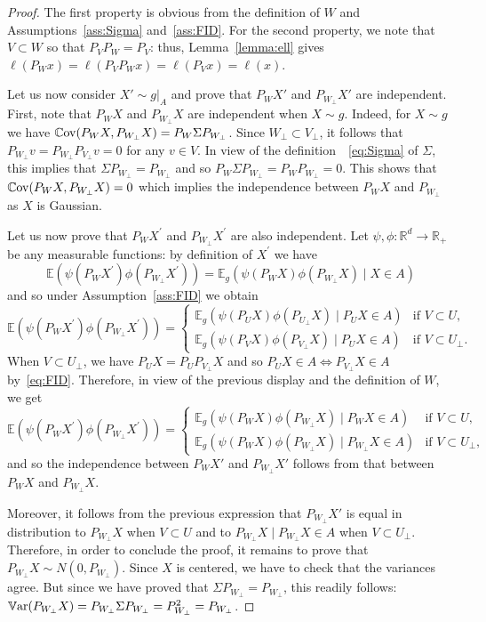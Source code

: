 \documentclass[]{article}
\newcommand{\E}{\mathbb{E}}
\newcommand{\R}{\mathbb{R}}
\newcommand{\Var}{\mathbb{V}\text{\textnormal{ar}}}
\newcommand{\Cov}{\mathbb{C}\text{\textnormal{ov}}}
\theoremstyle{plain}
\theoremstyle{definition}
\begin{document}
\begin{proof}
	The first property is obvious from the definition of $W$ and Assumptions~\ref{ass:Sigma} and~\ref{ass:FID}. For the second property, we note that $V \subset W$ so that $P_V P_W = P_V$: thus, Lemma~\ref{lemma:ell} gives $\ell(P_W x) = \ell(P_V P_W x) = \ell(P_V x) = \ell(x)$.
	
	Let us now consider $X' \sim g|_A$ and prove that $P_W X'$ and $P_{W_\perp} X'$ are independent. First, note that $P_W X$ and $P_{W_\perp} X$ are independent when $X \sim g$. Indeed, for $X \sim g$ we have $\Cov(P_W X, P_{W_\perp} X) = P_W \Sigma P_{W_\perp}$. Since $W_\perp \subset V_\perp$, it follows that $P_{W_\perp} v = P_{W_\perp} P_{V_\perp} v = 0$ for any $v \in V$. In view of the definition~~\eqref{eq:Sigma} of $\Sigma$, this implies that $\Sigma P_{W_\perp} = P_{W_\perp}$ and so $P_W \Sigma P_{W_\perp} = P_W P_{W_\perp} = 0$. This shows that $\Cov(P_W X, P_{W_\perp} X) = 0$ which implies the independence between $P_W X$ and $P_{W_\perp}$ as $X$ is Gaussian.
	
	Let us now prove that $P_W X^\prime$ and $P_{W_\perp} X^\prime$ are also independent. Let $\psi, \phi: \R^d \to \R_+$ be any measurable functions: by definition of $X^\prime$ we have
	\[ \E(\psi(P_W X^\prime) \phi(P_{W_\perp} X^\prime)) = \E_g(\psi(P_W X) \phi(P_{W_\perp} X) \mid X \in A) \]
	and so under Assumption~\ref{ass:FID} we obtain
	\[ \E(\psi(P_W X^\prime) \phi(P_{W_\perp} X^\prime)) = \left\{\begin{array}{ll} \E_g(\psi(P_U X) \phi(P_{U_\perp} X) \mid P_U X \in A) & \text{if } V \subset U,\\\E_g(\psi(P_V X) \phi(P_{V_\perp} X) \mid P_U X \in A) & \text{if } V \subset U_\perp. \end{array} \right. \]
	When $V \subset U_\perp$, we have $P_U X = P_U P_{V_\perp} X$ and so $P_U X \in A \Leftrightarrow P_{V_\perp} X \in A$ by~\eqref{eq:FID}. Therefore, in view of the previous display and the definition of $W$, we get
	\begin{equation} \label{eq:interm}
		\E(\psi(P_W X^\prime) \phi(P_{W_\perp} X^\prime)) = \left\{\begin{array}{ll} \E_g(\psi(P_W X) \phi(P_{W_\perp} X) \mid P_W X \in A) & \text{if } V \subset U,\\\E_g(\psi(P_W X) \phi(P_{W_\perp} X) \mid P_{W_\perp} X \in A) & \text{if } V \subset U_\perp, \end{array} \right.
	\end{equation}
	and so the independence between $P_W X'$ and $P_{W_\perp} X'$ follows from that between $P_W X$ and $P_{W_\perp} X$.
	
	Moreover, it follows from the previous expression that $P_{W_\perp} X'$ is equal in distribution to $P_{W_\perp} X$ when $V \subset U$ and to $P_{W_\perp} X \mid P_{W_\perp} X \in A$ when $V \subset U_\perp$. Therefore, in order to conclude the proof, it remains to prove that $P_{W_\perp} X \sim N(0, P_{W_\perp})$. Since $X$ is centered, we have to check that the variances agree. But since we have proved that $\Sigma P_{W_\perp} = P_{W_\perp}$, this readily follows: $\Var(P_{W_\perp} X) = P_{W_\perp} \Sigma P_{W_\perp} = P_{W_\perp}^2 = P_{W_\perp}$.
\end{proof}
\end{document}
